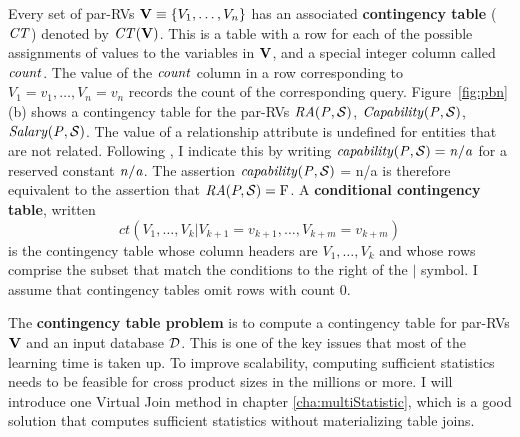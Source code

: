 \documentclass{sfuthesis}
\newcommand{\ct}{\mathit{ct}}
\begin{document}
Every set of par-RVs $\set{V} \equiv \{\V_{1},\ldots,\V_{n} \}$ has an associated \textbf{contingency table} ($\cttable$) denoted by $\cttable(\set{V})$.
This is a table with a row for each of the possible assignments of values to the variables in $\set{V}$, and a special integer column called $\qcount$. 
The value of the $\qcount$ column in a row 
corresponding to $V_{1} = v_{1},\ldots,V_{n} = v_{n}$ records the count of the 
corresponding query. 
Figure~\ref{fig:pbn} (b) shows a contingency table for the par-RVs $\it{RA}(\P,\S)$, $\it{Capability}(\P,\S)$, $\it{Salary}(\P,\S)$. 
The value of a relationship attribute is undefined for entities that are not related.
Following \cite{Russell2010}, I  indicate this by writing 
$\it{capability(\P,\S)} = n/a $ for a reserved constant $\it{n/a}$. 
The assertion $\it{capability(\P,\S)}$ = n/a is therefore equivalent to the assertion that $\ra(\P,\S) = \false$. A \textbf{conditional contingency table}, written $$\ct(V_{1},\ldots,V_{k}|V_{k+1} = v_{k+1},\ldots, V_{k+m} = v_{k+m})$$
is the contingency table whose column headers are $V_{1},\ldots,V_{k}$ and whose rows comprise the subset that match the conditions to the right of the $\vert$ symbol.  %
I  assume that contingency tables omit rows with count 0.

The \textbf{contingency table problem} is to compute a contingency table for par-RVs $\set{V} $ and an input database $\D$.  
This is one of the key issues that most of the learning time is taken up. To improve scalability, computing sufficient statistics needs to be feasible for cross product sizes in the millions or more.  I will introduce one Virtual Join method in chapter \ref{cha:multiStatistic}, which is a good solution that computes sufficient statistics without materializing table joins.%
\end{document}
